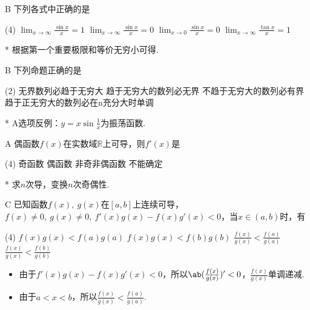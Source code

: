 \begin{choice}{B}
    下列各式中正确的是
\begin{tasks}(4)
    \task $\lim_{x\to\infty}\frac{\sin x}{x}=1$
    \task $\lim_{x\to\infty}\frac{\sin x}{x}=0$
    \task $\lim_{x\to0}\frac{\sin x}{x}=0$
    \task $\lim_{x\to\infty}\frac{\tan x}{x}=1$
\end{tasks}
\end{choice}
\begin{solution}*
    根据第一个重要极限和等价无穷小可得.
\end{solution}

\begin{choice}{B}
    下列命题正确的是
    \begin{tasks}(2)
        \task 无界数列必趋于无穷大
        \task 趋于无穷大的数列必无界
        \task 不趋于无穷大的数列必有界
        \task 趋于正无穷大的数列必在n充分大时单调
    \end{tasks}
\end{choice}
\begin{solution}*
    A选项反例：$y=x\sin\frac1x$为振荡函数. 
\end{solution}

\begin{choice}{A}
    偶函数$f(x)$在实数域$\mathbb{R}$上可导，则$f'(x)$是
    \begin{tasks}(4)
        \task 奇函数
        \task 偶函数
        \task 非奇非偶函数
        \task 不能确定
    \end{tasks}
\end{choice}
\begin{solution}*
    求$n$次导，变换$n$次奇偶性. 
\end{solution}
    
\begin{choice}{C}
    已知函数$f(x),\ g(x)$在$[a,b]$上连续可导，$f(x)\neq 0,\ g(x)\neq 0,\ f'(x)g(x)-f(x)g'(x)<0$，当$x\in(a,b)$时，有
\begin{tasks}(4)
    \task $f(x)g(x)<f(a)g(a)$
    \task $f(x)g(x)<f(b)g(b)$
    \task $\frac{f(x)}{g(x)}<\frac{f(a)}{g(a)}$
    \task $\frac{f(x)}{g(x)}<\frac{f(b)}{g(b)}$
\end{tasks}
\end{choice}
\begin{solution}
\begin{itemize}
    \item 由于$f'(x)g(x)-f(x)g'(x)<0$，所以$\ab(\frac{f(x)}{g(x)})'<0$，$\frac{f(x)}{g(x)}$单调递减.
    \item 由于$a<x<b$，所以$\frac{f(x)}{g(x)}<\frac{f(a)}{g(a)}$. 
\end{itemize}
\end{solution}

